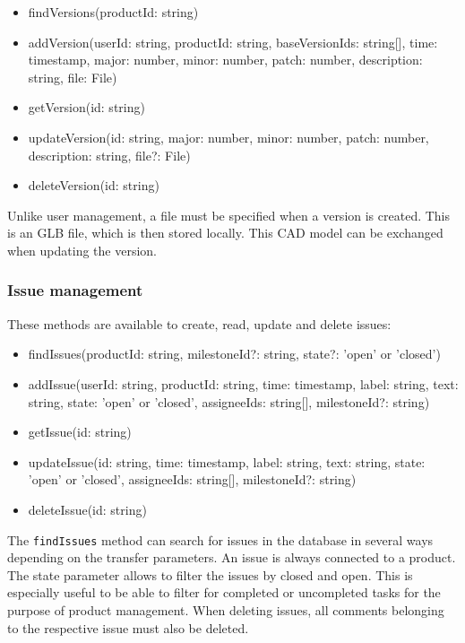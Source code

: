     \begin{itemize}
        \item findVersions(productId: string)
        \item addVersion(userId: string, productId: string, baseVersionIds: string[], time: timestamp, major: number, minor: number, patch: number, description: string, file: File)
        \item getVersion(id: string)
        \item updateVersion(id: string, major: number, minor: number, patch: number, description: string, file?: File)
        \item deleteVersion(id: string)
    \end{itemize}

    Unlike user management, a file must be specified when a version is created. This is an GLB file, which is then stored locally. This CAD model can be exchanged when updating the version.

    \subsubsection*{Issue management} 
    These methods are available to create, read, update and delete issues:
    \begin{itemize}
        \item findIssues(productId: string, milestoneId?: string, state?: 'open' or 'closed')
        \item addIssue(userId: string, productId: string, time: timestamp, label: string, text: string, state: 'open' or 'closed', assigneeIds: string[], milestoneId?: string)
        \item getIssue(id: string)
        \item updateIssue(id: string, time: timestamp, label: string, text: string, state: 'open' or 'closed', assigneeIds: string[], milestoneId?: string)
        \item deleteIssue(id: string)
    \end{itemize}

    The \texttt{findIssues} method can search for issues in the database in several ways depending on the transfer parameters. An issue is always connected to a product. The state parameter allows to filter the issues by closed and open. This is especially useful to be able to filter for completed or uncompleted tasks for  the purpose of product management. When deleting issues, all comments belonging to the respective issue must also be deleted.

